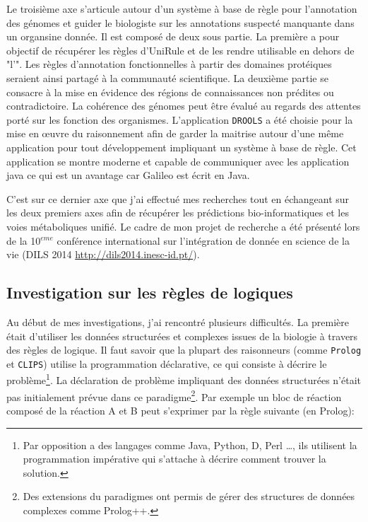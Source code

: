 \begin{refsegment}
Le troisième axe s'articule autour d'un système à base de règle pour l'annotation des génomes et guider le biologiste sur les annotations suspecté manquante dans un organsine donnée. Il est composé de deux sous partie. La première a pour objectif de récupérer les règles d'UniRule et de les rendre utilisable en dehors de "l'". Les règles d'annotation fonctionnelles à partir des domaines protéiques seraient ainsi partagé à la communauté scientifique. La deuxième partie se consacre à la mise en évidence des régions de connaissances non prédites ou contradictoire. La cohérence des génomes peut être évalué au regards des attentes porté sur les fonction des organismes. L'application \texttt{DROOLS} a été choisie pour la mise en œuvre du raisonnement afin de garder la maitrise autour d'une même application pour tout développement impliquant un système à base de règle. Cet application se montre moderne et capable de communiquer avec les application java ce  qui est un avantage car Galileo est écrit en Java.

C'est sur ce dernier axe que j'ai effectué mes recherches tout en échangeant sur les deux premiers axes afin de récupérer les prédictions bio-informatiques et les voies métaboliques unifié. Le cadre de mon projet de recherche a été présenté lors de la 10$^{eme}$ conférence international sur l'intégration de donnée en science de la vie (DILS 2014 \url{http://dils2014.inesc-id.pt/}).



\subsection{Investigation sur les règles de logiques}

Au début de mes investigations, j'ai rencontré plusieurs difficultés. La première était d'utiliser les données structurées et complexes issues de la biologie à travers des règles de logique. Il faut savoir que la plupart des raisonneurs (comme \texttt{Prolog} et \texttt{CLIPS}) utilise la programmation déclarative, ce qui consiste à décrire le problème\footnote{Par opposition a des langages comme Java, Python, D, Perl \ldots, ils utilisent la programmation impérative qui s'attache à décrire comment trouver la solution.}. La déclaration de problème impliquant  des données structurées n'était pas initialement prévue dans ce paradigme\footnote{Des extensions du paradigmes ont permis de gérer des structures de données complexes comme Prolog++.}. Par exemple un bloc de réaction  composé de la réaction A et B peut s'exprimer par la règle suivante (en Prolog):


\end{refsegment}
